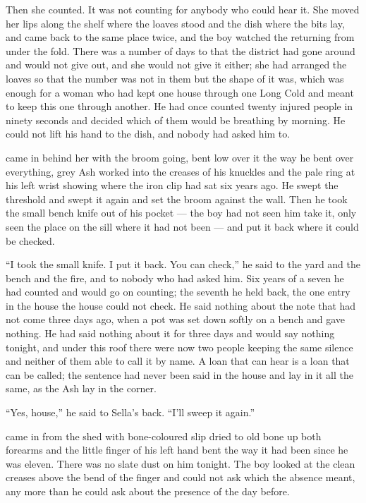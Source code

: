 Then she counted. It was not counting for anybody who could hear it. She moved her lips along the shelf where the loaves stood and the dish where the bits lay, and came back to the same place twice, and the boy watched the returning from under the fold. There was a number of days to  that the district had gone around and would not give out, and she would not give it either; she had arranged the loaves so that the number was not in them but the shape of it was, which was enough for a woman who had kept one house through one Long Cold and meant to keep this one through another. He had once counted twenty injured people in ninety seconds and decided which of them would be breathing by morning. He could not lift his hand to the dish, and nobody had asked him to.

 came in behind her with the broom going, bent low over it the way he bent over everything, grey Ash worked into the creases of his knuckles and the pale ring at his left wrist showing where the iron clip had sat six years ago. He swept the threshold and swept it again and set the broom against the wall. Then he took the small bench knife out of his pocket --- the boy had not seen him take it, only seen the place on the sill where it had not been --- and put it back where it could be checked.

“I took the small knife. I put it back. You can check,” he said to the yard and the bench and the fire, and to nobody who had asked him. Six years of a seven he had counted and would go on counting; the seventh he held back, the one entry in the house the house could not check. He said nothing about the note that had not come three days ago, when a pot was set down softly on a bench and gave nothing. He had said nothing about it for three days and would say nothing tonight, and under this roof there were now two people keeping the same silence and neither of them able to call it by name. A loan that can hear is a loan that can be called; the sentence had never been said in the house and lay in it all the same, as the Ash lay in the corner.

“Yes, house,” he said to Sella's back. “I'll sweep it again.”

 came in from the shed with bone-coloured slip dried to old bone up both forearms and the little finger of his left hand bent the way it had been since he was eleven. There was no slate dust on him tonight. The boy looked at the clean creases above the bend of the finger and could not ask which the absence meant, any more than he could ask about the presence of the day before.

